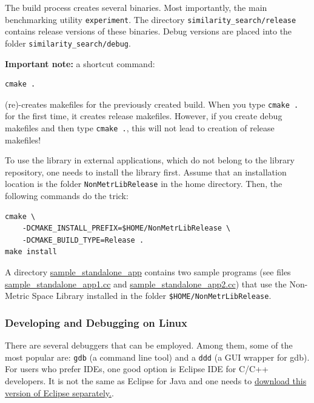 \documentclass[runningheads,a4paper]{llncs}
\newcommand{\nonmetrlib}{Non-Metric Space Library}
\newcommand{\replocfile}{https://github.com/searchivarius/NonMetricSpaceLib/blob/develop/}
\newcommand{\ttt}[1]{\texttt{#1}}
\begin{document}
{The build process creates several binaries. Most importantly,
the main benchmarking utility \ttt{experiment}.
The directory \ttt{similarity\_search/release} contains release versions of
these binaries. Debug versions are placed into the folder \ttt{similarity\_search/debug}.

\textbf{Important note:} a shortcut command:
\begin{verbatim}
cmake .
\end{verbatim} 
(re)-creates makefiles for the previously 
created build. When you type \ttt{cmake .} for the first time,
it creates release makefiles. However, if you create debug
makefiles and then type \ttt{cmake .}, 
this will not lead to creation of release makefiles! 

To use the library in external applications, which do not belong to the library repository,
one needs to install the library first.
Assume that an installation location is the folder \ttt{NonMetrLibRelease} in the
home directory. Then, the following commands do the trick:
\begin{verbatim}
cmake \
    -DCMAKE_INSTALL_PREFIX=$HOME/NonMetrLibRelease \
    -DCMAKE_BUILD_TYPE=Release .
make install
\end{verbatim}

A directory \href{\replocfile sample_standalone_app}{sample\_standalone\_app} 
contains two sample programs (see files 
\href{\replocfile sample_standalone_app/sample_standalone_app1.cc}{sample\_standalone\_app1.cc}
and
\href{\replocfile sample_standalone_app/sample_standalone_app2.cc}{sample\_standalone\_app2.cc})
that use the \nonmetrlib{} installed in the folder \ttt{\$HOME/NonMetrLibRelease}.

\subsubsection{Developing and Debugging on Linux}
There are several debuggers that can be employed.
Among them, some of the most popular are: \ttt{gdb} (a command line tool)
and a \ttt{ddd} (a GUI wrapper for gdb).
For users who prefer IDEs, one good option is Eclipse IDE for C/C++
developers.
It is not the same as Eclipse for Java and one needs 
to \href{http://www.eclipse.org/ide/}{download 
this version of Eclipse separately.}.

}
\end{document}
